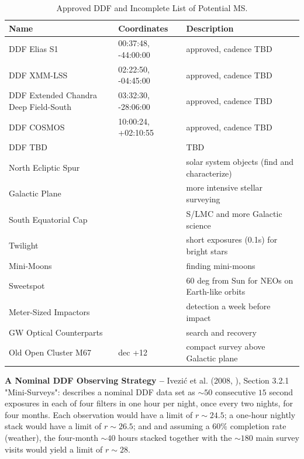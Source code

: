 \documentclass[DM,lsstdraft,toc]{lsstdoc}
\begin{document}
\begin{table}[h]
\begin{center}
\begin{footnotesize}
\caption{Approved DDF and Incomplete List of Potential MS.}
\label{tab:ddfms}
\begin{tabular}{lll}
\hline \hline
Name & Coordinates & Description  \\
\hline
DDF Elias S1    & 00:37:48, -44:00:00  & approved, cadence TBD \\
DDF XMM-LSS & 02:22:50, -04:45:00  & approved, cadence TBD  \\
DDF Extended Chandra Deep Field-South & 03:32:30, -28:06:00  & approved, cadence TBD  \\
DDF COSMOS  & 10:00:24, +02:10:55 & approved, cadence TBD  \\
DDF TBD  & & TBD \\
North Ecliptic Spur      & & solar system objects (find and characterize) \\
Galactic Plane             & & more intensive stellar surveying \\
South Equatorial Cap  & & S/LMC and more Galactic science \\
Twilight                        & & short exposures (0.1s) for bright stars \\
Mini-Moons                     &  & finding mini-moons \\
Sweetspot                       & & 60 deg from Sun for NEOs on Earth-like orbits \\
Meter-Sized Impactors     & & detection a week before impact \\
GW Optical Counterparts & & search and recovery \\
Old Open Cluster M67      & dec +12 & compact survey above Galactic plane  \\
\hline
\end{tabular}
\end{footnotesize}
\end{center}
\end{table}

\textbf{A Nominal DDF Observing Strategy -- } Ivezi\'{c} et al. (2008, \cite{2008arXiv0805.2366I}), Section 3.2.1 "Mini-Surveys": describes a nominal DDF data set as $\sim50$ consecutive $15$ second exposures in each of four filters in one hour per night, once every two nights, for four months. Each observation would have a limit of $r\sim24.5$; a one-hour nightly stack would have a limit of $r\sim26.5$; and and assuming a $60\%$ completion rate (weather), the four-month $\sim40$ hours stacked together with the $\sim180$ main survey visits would yield a limit of $r\sim28$. 
\end{document}
